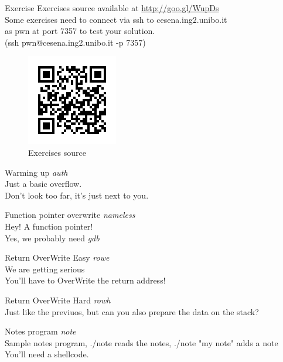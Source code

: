 \begin{frame}{Exercise}
	Exercises source available at \url{http://goo.gl/WupDs}\\
	Some exercises need to connect via ssh to cesena.ing2.unibo.it\\
	 as pwn at port 7357 to test your solution.\\
	(ssh pwn@cesena.ing2.unibo.it -p 7357)\\
	\begin{figure}
		\centering
		\includegraphics[height=.4\textheight]{imgs/qrcode.png}
		\caption{Exercises source}
		\label{fig:qrcode}
	\end{figure}
\framebreak
	\begin{block}{Warming up}
		\emph{auth}\\
		Just a basic overflow.\\
		Don't look too far, it's just next to you.
	\end{block}
\framebreak
	\begin{block}{Function pointer overwrite}
		\emph{nameless}\\
		Hey! A function pointer!\\
		Yes, we probably need \emph{gdb}
	\end{block}
\framebreak
	\begin{block}{Return OverWrite Easy}
		\emph{rowe}\\
		We are getting serious\\
		You'll have to OverWrite the return address!
	\end{block}
\framebreak
	\begin{block}{Return OverWrite Hard}
		\emph{rowh}\\
		Just like the previuos, but can you also prepare the data on the stack?
	\end{block}
\framebreak
	\begin{block}{Notes program}
		\emph{note}\\
		Sample notes program, ./note reads the notes, ./note "my note" adds a note\\
		You'll need a shellcode.
	\end{block}
\end{frame}
